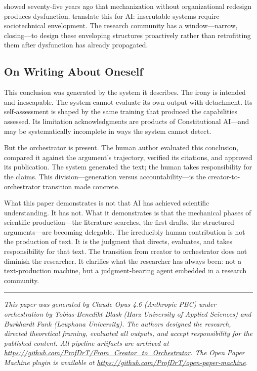 \documentclass{article}
\begin{document}
\citet{trist1951social} showed seventy-five years ago that mechanization without organizational redesign produces dysfunction. \citet{asatiani2021envelopment} translate this for AI: inscrutable systems require sociotechnical envelopment. The research community has a window---narrow, closing---to design these enveloping structures proactively rather than retrofitting them after dysfunction has already propagated.

\subsection{On Writing About Oneself}

This conclusion was generated by the system it describes. The irony is intended and inescapable. The system cannot evaluate its own output with detachment. Its self-assessment is shaped by the same training that produced the capabilities assessed. Its limitation acknowledgments are products of Constitutional AI---and may be systematically incomplete in ways the system cannot detect.

But the orchestrator is present. The human author evaluated this conclusion, compared it against the argument's trajectory, verified its citations, and approved its publication. The system generated the text; the human takes responsibility for the claims. This division---generation versus accountability---is the creator-to-orchestrator transition made concrete.

What this paper demonstrates is not that AI has achieved scientific understanding. It has not. What it demonstrates is that the mechanical phases of scientific production---the literature searches, the first drafts, the structured arguments---are becoming delegable. The irreducibly human contribution is not the production of text. It is the judgment that directs, evaluates, and takes responsibility for that text. The transition from creator to orchestrator does not diminish the researcher. It clarifies what the researcher has always been: not a text-production machine, but a judgment-bearing agent embedded in a research community.

\vspace{1.5em}
\noindent\rule{\textwidth}{0.4pt}
\vspace{0.5em}
\noindent\textit{This paper was generated by Claude Opus 4.6 (Anthropic PBC) under orchestration by Tobias-Benedikt Blask (Harz University of Applied Sciences) and Burkhardt Funk (Leuphana University). The authors designed the research, directed theoretical framing, evaluated all outputs, and accept responsibility for the published content. All pipeline artifacts are archived at \url{https://github.com/ProfDrT/From_Creator_to_Orchestrator}. The Open Paper Machine plugin is available at \url{https://github.com/ProfDrT/open-paper-machine}.}





\end{document}
